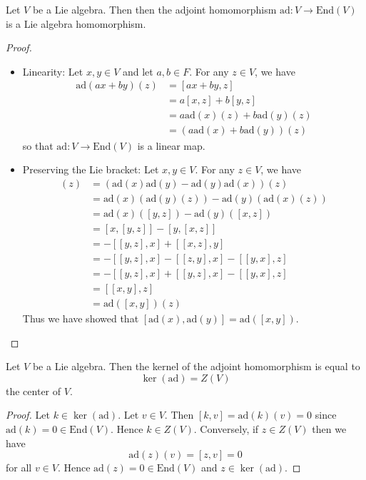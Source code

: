 \documentclass[a4paper]{article}
\begin{document}
\begin{lmm}{}{} Let $V$ be a Lie algebra. Then then the adjoint homomorphism $\text{ad}:V\to\text{End}(V)$ is a Lie algebra homomorphism. \tcbline
\begin{proof}~\\
\begin{itemize}
\item Linearity: Let $x,y\in V$ and let $a,b\in F$. For any $z\in V$, we have
\begin{align*}
\text{ad}(ax+by)(z)&=[ax+by,z]\\
&=a[x,z]+b[y,z]\\
&=a\text{ad}(x)(z)+b\text{ad}(y)(z)\\
&=\left(a\text{ad}(x)+b\text{ad}(y)\right)(z)
\end{align*}
so that $\text{ad}:V\to\text{End}(V)$ is a linear map. 
\item Preserving the Lie bracket: Let $x,y\in V$. For any $z\in V$, we have
\begin{align*}
[\text{ad}(x),\text{ad}(y)](z)&=\left(\text{ad}(x)\text{ad}(y)-\text{ad}(y)\text{ad}(x)\right)(z)\\
&=\text{ad}(x)\left(\text{ad}(y)(z)\right)-\text{ad}(y)\left(\text{ad}(x)(z)\right)\\
&=\text{ad}(x)([y,z])-\text{ad}(y)([x,z])\\
&=[x,[y,z]]-[y,[x,z]]\\
&=-[[y,z],x]+[[x,z],y]\\
&=-[[y,z],x]-[[z,y],x]-[[y,x],z]\\
&=-[[y,z],x]+[[y,z],x]-[[y,x],z]\\
&=[[x,y],z]\\
&=\text{ad}([x,y])(z)
\end{align*}
Thus we have showed that $[\text{ad}(x),\text{ad}(y)]=\text{ad}([x,y])$. 
\end{itemize}
\end{proof}
\end{lmm}

\begin{lmm}{}{} Let $V$ be a Lie algebra. Then the kernel of the adjoint homomorphism is equal to $$\ker(\text{ad})=Z(V)$$ the center of $V$. \tcbline
\begin{proof}
Let $k\in\ker(\text{ad})$. Let $v\in V$. Then $[k,v]=\text{ad}(k)(v)=0$ since $\text{ad}(k)=0\in\text{End}(V)$. Hence $k\in Z(V)$. Conversely, if $z\in Z(V)$ then we have $$\text{ad}(z)(v)=[z,v]=0$$ for all $v\in V$. Hence $\text{ad}(z)=0\in\text{End}(V)$ and $z\in\ker(\text{ad})$. 
\end{proof}
\end{lmm}
\end{document}
